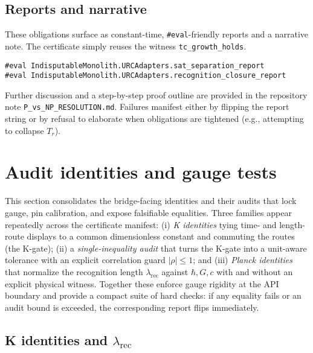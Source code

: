 \documentclass[11pt,a4paper,twoside]{article}
\numberwithin{equation}{section}
\theoremstyle{customthm}
\theoremstyle{customdef}
\theoremstyle{customrem}
\begin{document}
\subsection{Reports and narrative}\label{subsec:pn-reports}

These obligations surface as constant-time, \texttt{\#eval}-friendly reports and a narrative note. The certificate simply reuses the witness \texttt{tc\_growth\_holds}.

\begin{lstlisting}
#eval IndisputableMonolith.URCAdapters.sat_separation_report
#eval IndisputableMonolith.URCAdapters.recognition_closure_report
\end{lstlisting}

Further discussion and a step-by-step proof outline are provided in the repository note \texttt{P\_vs\_NP\_RESOLUTION.md}. Failures manifest either by flipping the report string or by refusal to elaborate when obligations are tightened (e.g., attempting to collapse \(T_r\)).

\section{Audit identities and gauge tests}\label{sec:audit}

This section consolidates the bridge-facing identities and their audits that lock gauge, pin calibration, and expose falsifiable equalities. Three families appear repeatedly across the certificate manifest: (i) \emph{K identities} tying time- and length-route displays to a common dimensionless constant and commuting the routes (the K-gate); (ii) a \emph{single-inequality audit} that turns the K-gate into a unit-aware tolerance with an explicit correlation guard \(|\rho|\le 1\); and (iii) \emph{Planck identities} that normalize the recognition length \(\lambda_{\mathrm{rec}}\) against \(\hbar,G,c\) with and without an explicit physical witness. Together these enforce gauge rigidity at the API boundary and provide a compact suite of hard checks: if any equality fails or an audit bound is exceeded, the corresponding report flips immediately.

\subsection{K identities and \(\lambda_{\mathrm{rec}}\)}\label{subsec:audit-k-lrec}
\end{document}
